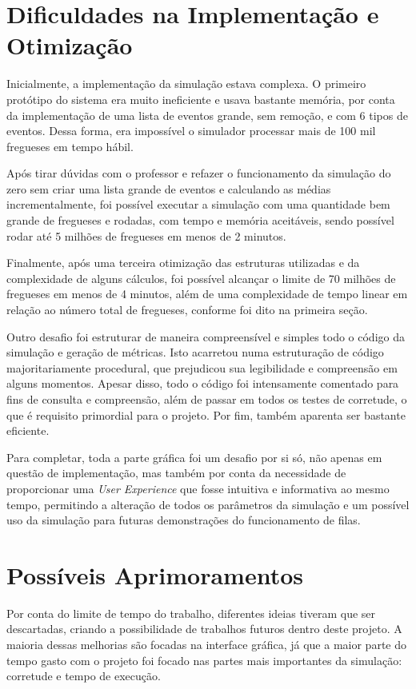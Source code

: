 \documentclass[a4paper,12pt]{report}
\begin{document}
\section{Dificuldades na Implementação e Otimização}

Inicialmente, a implementação da simulação estava complexa. O primeiro protótipo do sistema era muito ineficiente e usava bastante memória, por conta da implementação de uma lista de eventos grande, sem remoção, e com 6 tipos de eventos. Dessa forma, era impossível o simulador processar mais de 100 mil fregueses em tempo hábil. 

Após tirar dúvidas com o professor e refazer o funcionamento da simulação do zero sem criar uma lista grande de eventos e calculando as médias incrementalmente, foi possível executar a simulação com uma quantidade bem grande de fregueses e rodadas, com tempo e memória aceitáveis, sendo possível rodar até 5 milhões de fregueses em menos de 2 minutos.

Finalmente, após uma terceira otimização das estruturas utilizadas e da complexidade de alguns cálculos, foi possível alcançar o limite de 70 milhões de fregueses em menos de 4 minutos, além de uma complexidade de tempo linear em relação ao número total de fregueses, conforme foi dito na primeira seção.

Outro desafio foi estruturar de maneira compreensível e simples todo o código da simulação e geração de métricas. Isto acarretou numa estruturação de código majoritariamente procedural, que prejudicou sua legibilidade e compreensão em alguns momentos. Apesar disso, todo o código foi intensamente comentado para fins de consulta e compreensão, além de passar em todos os testes de corretude, o que é requisito primordial para o projeto. Por fim, também aparenta ser bastante eficiente. 

Para completar, toda a parte gráfica foi um desafio por si só, não apenas em questão de implementação, mas também por conta da necessidade de proporcionar uma \emph{User Experience} que fosse intuitiva e informativa ao mesmo tempo, permitindo a alteração de todos os parâmetros da simulação e um possível uso da simulação para futuras demonstrações do funcionamento de filas.

\section{Possíveis Aprimoramentos}

Por conta do limite de tempo do trabalho, diferentes ideias tiveram que ser descartadas, criando a possibilidade de trabalhos futuros dentro deste projeto. A maioria dessas melhorias são focadas na interface gráfica, já que a maior parte do tempo gasto com o projeto foi focado nas partes mais importantes da simulação: corretude e tempo de execução. 
\end{document}
